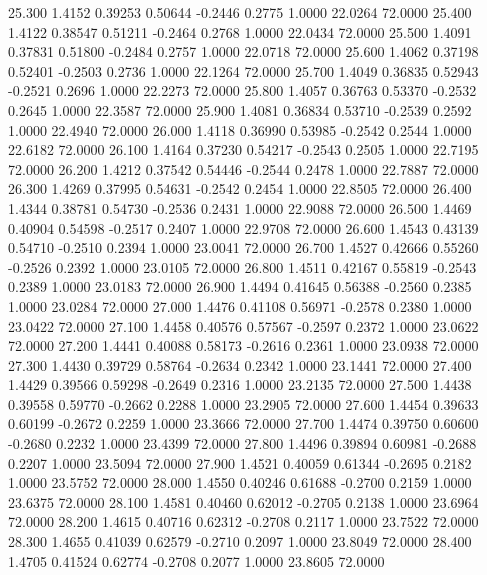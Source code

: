   25.300   1.4152   0.39253   0.50644  -0.2446   0.2775   1.0000  22.0264  72.0000
  25.400   1.4122   0.38547   0.51211  -0.2464   0.2768   1.0000  22.0434  72.0000
  25.500   1.4091   0.37831   0.51800  -0.2484   0.2757   1.0000  22.0718  72.0000
  25.600   1.4062   0.37198   0.52401  -0.2503   0.2736   1.0000  22.1264  72.0000
  25.700   1.4049   0.36835   0.52943  -0.2521   0.2696   1.0000  22.2273  72.0000
  25.800   1.4057   0.36763   0.53370  -0.2532   0.2645   1.0000  22.3587  72.0000
  25.900   1.4081   0.36834   0.53710  -0.2539   0.2592   1.0000  22.4940  72.0000
  26.000   1.4118   0.36990   0.53985  -0.2542   0.2544   1.0000  22.6182  72.0000
  26.100   1.4164   0.37230   0.54217  -0.2543   0.2505   1.0000  22.7195  72.0000
  26.200   1.4212   0.37542   0.54446  -0.2544   0.2478   1.0000  22.7887  72.0000
  26.300   1.4269   0.37995   0.54631  -0.2542   0.2454   1.0000  22.8505  72.0000
  26.400   1.4344   0.38781   0.54730  -0.2536   0.2431   1.0000  22.9088  72.0000
  26.500   1.4469   0.40904   0.54598  -0.2517   0.2407   1.0000  22.9708  72.0000
  26.600   1.4543   0.43139   0.54710  -0.2510   0.2394   1.0000  23.0041  72.0000
  26.700   1.4527   0.42666   0.55260  -0.2526   0.2392   1.0000  23.0105  72.0000
  26.800   1.4511   0.42167   0.55819  -0.2543   0.2389   1.0000  23.0183  72.0000
  26.900   1.4494   0.41645   0.56388  -0.2560   0.2385   1.0000  23.0284  72.0000
  27.000   1.4476   0.41108   0.56971  -0.2578   0.2380   1.0000  23.0422  72.0000
  27.100   1.4458   0.40576   0.57567  -0.2597   0.2372   1.0000  23.0622  72.0000
  27.200   1.4441   0.40088   0.58173  -0.2616   0.2361   1.0000  23.0938  72.0000
  27.300   1.4430   0.39729   0.58764  -0.2634   0.2342   1.0000  23.1441  72.0000
  27.400   1.4429   0.39566   0.59298  -0.2649   0.2316   1.0000  23.2135  72.0000
  27.500   1.4438   0.39558   0.59770  -0.2662   0.2288   1.0000  23.2905  72.0000
  27.600   1.4454   0.39633   0.60199  -0.2672   0.2259   1.0000  23.3666  72.0000
  27.700   1.4474   0.39750   0.60600  -0.2680   0.2232   1.0000  23.4399  72.0000
  27.800   1.4496   0.39894   0.60981  -0.2688   0.2207   1.0000  23.5094  72.0000
  27.900   1.4521   0.40059   0.61344  -0.2695   0.2182   1.0000  23.5752  72.0000
  28.000   1.4550   0.40246   0.61688  -0.2700   0.2159   1.0000  23.6375  72.0000
  28.100   1.4581   0.40460   0.62012  -0.2705   0.2138   1.0000  23.6964  72.0000
  28.200   1.4615   0.40716   0.62312  -0.2708   0.2117   1.0000  23.7522  72.0000
  28.300   1.4655   0.41039   0.62579  -0.2710   0.2097   1.0000  23.8049  72.0000
  28.400   1.4705   0.41524   0.62774  -0.2708   0.2077   1.0000  23.8605  72.0000
